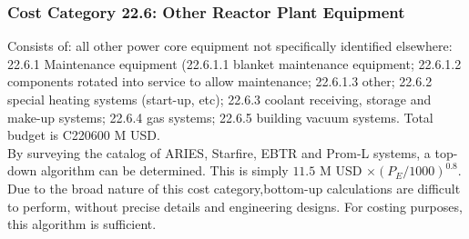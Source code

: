 \subsubsection{Cost Category 22.6: Other Reactor Plant Equipment}
Consists of: all other power core equipment not specifically identified elsewhere: 22.6.1 Maintenance equipment (22.6.1.1 blanket maintenance equipment; 22.6.1.2 components rotated into service to
allow maintenance; 22.6.1.3 other; 22.6.2 special heating systems (start-up, etc); 22.6.3 coolant receiving, storage and make-up systems; 22.6.4 gas systems; 22.6.5 building vacuum systems.  Total budget is C220600 M USD.\\

By surveying the catalog of ARIES, Starfire, EBTR and Prom-L systems, a top-down algorithm can be determined. This is simply $11.5$ M USD $\times (P_E/1000)^{0.8}$. Due to the broad nature of this cost category,bottom-up calculations are difficult to perform, without precise details and engineering designs. For costing purposes, this algorithm is sufficient.